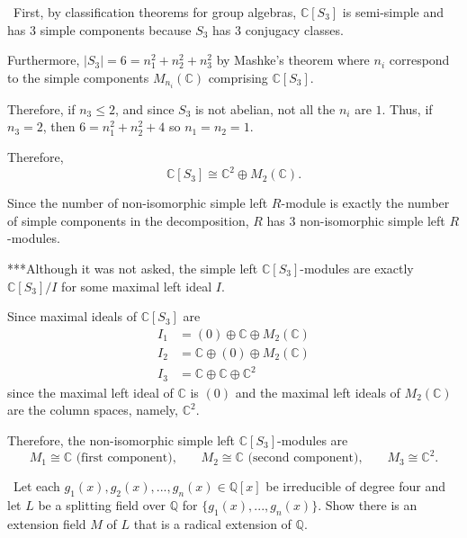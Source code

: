 \documentclass[12pt]{Qual}
\begin{document}
\begin{solution}$\,$
First, by classification theorems for group algebras, $\mathbb{C}[S_3]$ is semi-simple and has $3$ simple components because $S_3$ has $3$ conjugacy classes.

Furthermore, $|S_3|=6=n_1^2+n_2^2+n_3^2$ by Mashke's theorem where $n_i$ correspond to the simple components $M_{n_i}(\mathbb{C})$ comprising $\mathbb{C}[S_3]$.

Therefore, if $n_3\le 2$, and since $S_3$ is not abelian, not all the $n_i$ are $1$. Thus, if $n_3=2$, then $6=n_1^2+n_2^2+4$ so $n_1=n_2=1$.

Therefore, $$\mathbb{C}[S_3]\cong\mathbb{C}^2\oplus M_2(\mathbb{C}).$$

Since the number of non-isomorphic simple left $R$-module is exactly the number of simple components in the decomposition, $R$ has $3$ non-isomorphic simple left $R$-modules.

\begin{mybox}
***Although it was not asked, the simple left $\mathbb{C}[S_3]$-modules are exactly $\mathbb{C}[S_3]/I$ for some maximal left ideal $I.$

Since maximal ideals of $\mathbb{C}[S_3]$ are \begin{align*}
    I_1&=(0)\oplus\mathbb{C}\oplus M_2(\mathbb{C})\\
    I_2&=\mathbb{C}\oplus(0)\oplus M_2(\mathbb{C})\\
    I_3&=\mathbb{C}\oplus\mathbb{C}\oplus\mathbb{C}^2
\end{align*} since the maximal left ideal of $\mathbb{C}$ is $(0)$ and the maximal left ideals of $M_2(\mathbb{C})$ are the column spaces, namely, $\mathbb{C}^2$.

Therefore, the non-isomorphic simple left $\mathbb{C}[S_3]$-modules are $$M_1\cong\mathbb{C}\text{ (first component),}\qquad M_2\cong\mathbb{C}\text{ (second component),}\qquad M_3\cong\mathbb{C}^2.$$
\end{mybox}

\end{solution}
\newpage



\begin{problem} $\,$
Let each $g_1(x),g_2(x),...,g_n(x)\in\mathbb{Q}[x]$ be irreducible of degree four and let $L$ be a splitting field over $\mathbb{Q}$ for $\{g_1(x),...,g_n(x)\}.$ Show there is an extension field $M$ of $L$ that is a radical extension of $\mathbb{Q}.$
\end{problem}
\end{document}
